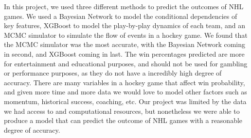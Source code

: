 \documentclass[11pt]{article}
\begin{document}
In this project, we used three different methods to predict the outcomes of NHL games. We used a Bayesian Network to model the conditional dependencies of key features, XGBoost to model the play-by-play dynamics of each team, and an MCMC simulator to simulate the flow of events in a hockey game. We found that the MCMC simulator was the most accurate, with the Bayesian Network coming in second, and XGBoost coming in last. 
The win percentages predicted are more for entertainment and educational purposes, and should not be used for gambling or performance purposes, as they do not have a incredibly high degree of accuracy. There are many variables in a hockey game that affect win probability, and given more time and more data we would love to model other factors such as momentum, historical success, coaching, etc. Our project was limited by the data
we had access to and computational resources, but nonetheless we were able to produce a model that can predict the outcome of NHL games with a reasonable degree of accuracy.

\newpage


\end{document}
